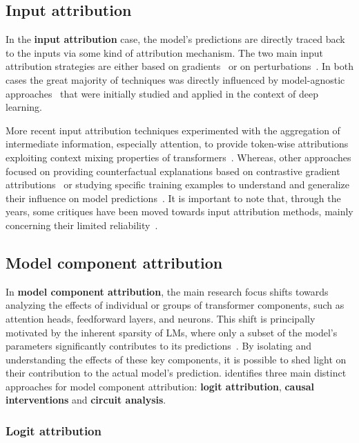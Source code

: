 \subsection{Input attribution}

In the \textbf{input attribution} case, the model's predictions are directly traced back to the inputs via some kind of attribution mechanism.
The two main input attribution strategies are either based on gradients~\cite{denil2014, ding2021, sanyal2021} or on perturbations~\cite{li2016, amara2024, mohebbi2023}.
In both cases the great majority of techniques was directly influenced by model-agnostic approaches~\cite{sundararajan2017, smilkov2017, ribeiro2016, lundberg2017} that were initially studied and applied in the context of deep learning.

More recent input attribution techniques experimented with the aggregation of intermediate information, especially attention, to provide token-wise attributions exploiting context mixing properties of transformers~\cite{ferrando2022, modarressi2022, mohebbi2023}.
Whereas, other approaches focused on providing counterfactual explanations based on contrastive gradient attributions~\cite{yin2022} or studying specific training examples to understand and generalize their influence on model predictions~\cite{grosse2023}.
It is important to note that, through the years, some critiques have been moved towards input attribution methods, mainly concerning their limited reliability~\cite{sixt2019, adebayo2018, atanasova2020}.

\subsection{Model component attribution}

In \textbf{model component attribution}, the main research focus shifts towards analyzing the effects of individual or groups of transformer components, such as attention heads, feedforward layers, and neurons.
This shift is principally motivated by the inherent sparsity of LMs, where only a subset of the model's parameters significantly contributes to its predictions~\cite{zhao2021}.
By isolating and understanding the effects of these key components, it is possible to shed light on their contribution to the actual model's prediction.
\citet{ferrando2024} identifies three main distinct approaches for model component attribution: \textbf{logit attribution}, \textbf{causal interventions} and \textbf{circuit analysis}.

\subsubsection*{Logit attribution}

